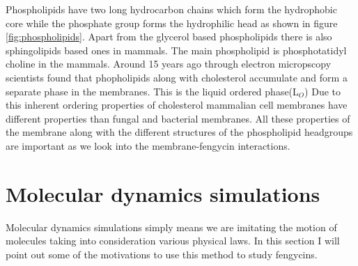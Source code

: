 Phospholipids have two long hydrocarbon chains which form the hydrophobic core while the 
phosphate group forms the hydrophilic head as shown in figure \ref{fig:phospholipids}. \cite{Slotte2002}
Apart from the glycerol based phospholipids there is also 
sphingolipids based ones in mammals. The main phospholipid is 
phosphotatidyl choline in the mammals. \cite{Kroon2011,Slotte2002}
Around 15 years ago through electron micropscopy scientists found that phopholipids along with cholesterol 
accumulate and form a separate phase in the membranes.\cite{Kroon2011} This is
the liquid ordered phase(L$_O$)
Due to this inherent ordering properties of cholesterol 
mammalian cell membranes have different properties than 
fungal and bacterial membranes.
All these properties of the membrane along with the different structures of the phospholipid headgroups are important as we look into the membrane-fengycin interactions.


\section{Molecular dynamics simulations}
\label{ss:mdsim}
Molecular dynamics simulations simply means 
we are imitating the motion of molecules taking into 
consideration various physical laws. In this section I will point out some of the motivations to use 
this method to study fengycins.

